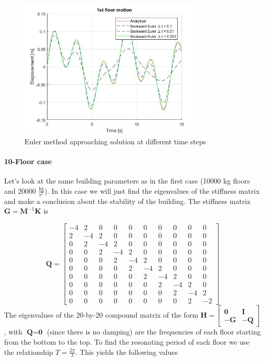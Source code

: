 \documentclass{article}
\begin{document}
				\begin{figure}[h!]
   					 \centering
   					 \includegraphics[width=90mm]{Eulerdiff.jpg}
   					 \caption{Euler method approaching solution at different time steps}
				            \label{fig9}
  				\end{figure}

				\paragraph{10-Floor case} Let's look at the same building parameters as in the first case (10000 kg floors and 20000 $\frac{\text{kg}}{\text{s}^2}$). In this case we will just find the eigenvalues of the stiffness matrix and make a conclusion about the stability of the building. The stiffness matrix $\textbf{G} = \textbf{M}^{-1}\textbf{K}$ is 

				\begin{equation*}
					\textbf{Q}=  \begin{bmatrix}-4&2&0&0&0&0&0&0&0&0\\2&-4&2&0&0&0&0&0&0&0\\0&2&-4&2&0&0&0&0&0&0\\0&0&2&-4&2&0&0&0&0&0\\0&0&0&2&-4&2&0&0&0&0\\
				  0&0&0&0&2&-4&2&0&0&0\\0&0&0&0&0&2&-4&2&0&0\\0&0&0&0&0&0&2&-4&2&0\\0&0&0&0&0&0&0&2&-4&2\\0&0&0&0&0&0&0&0&2&-2\end{bmatrix}
				\end{equation*}
The eigenvalues of the 20-by-20 compound matrix of the form $\textbf{H} = \begin{bmatrix} \textbf{0} & \textbf{I} \\ -\textbf{G} &-\textbf{Q}\end{bmatrix}$, with $\textbf{Q}=\textbf{0}$ (since there is no damping) are the frequencies of each floor starting from the bottom to the top. To find the resonating period of each floor we use the relationship $T=\frac{2\pi}{\lambda}$. This yields the following values
\end{document}
